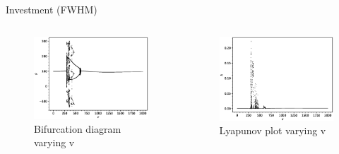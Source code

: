 \documentclass{beamer}
\begin{document}
\begin{frame}{Investment (FWHM)}
	\begin{columns}
	\begin{column}{0.5\textwidth}
		\begin{figure}
			\centering
			\includegraphics[width=1.2\textwidth]{vbifurcation.eps}
			\caption{Bifurcation diagram varying v}
		\end{figure}
	\end{column}
	\begin{column}{0.5\textwidth}
		\begin{figure}
			\centering
			\includegraphics[width=1.2\textwidth]{vlyplot.eps}
			\caption{Lyapunov plot varying v}
		\end{figure}
	\end{column}
	\end{columns}
\end{frame}
\end{document}
